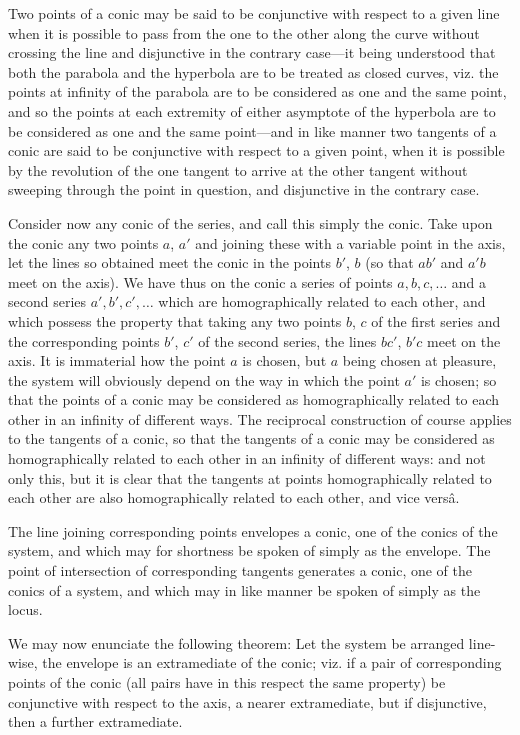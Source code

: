 \documentclass[11pt,a4paper]{book}
\begin{document}
Two points of a conic may be said to be conjunctive with respect to a given line when it is possible to pass from the one to the other along the curve without crossing the line and disjunctive in the contrary case---it being understood that both the parabola and the hyperbola are to be treated as closed curves, viz. the points at infinity of the parabola are to be considered as one and the same point, and so the points at each extremity of either asymptote of the hyperbola are to be considered as one and the same point---and in like manner two tangents of a conic are said to be conjunctive with respect to a given point, when it is possible by the revolution of the one tangent to arrive at the other tangent without sweeping through the point in question, and disjunctive in the contrary case.

Consider now any conic of the series, and call this simply the conic. Take upon the conic any two points $a$, $a'$ and joining these with a variable point in the axis, let the lines so obtained meet the conic in the points $b'$, $b$ (so that $ab'$ and $a'b$ meet on the axis). We have thus on the conic a series of points $a, b, c, \ldots$ and a second series $a', b', c', \ldots$ which are homographically related to each other, and which possess the property that taking any two points $b$, $c$ of the first series and the corresponding points $b'$, $c'$ of the second series, the lines $bc'$, $b'c$ meet on the axis. It is immaterial how the point $a$ is chosen, but $a$ being chosen at pleasure, the system will obviously depend on the way in which the point $a'$ is chosen; so that the points of a conic may be considered as homographically related to each other in an infinity of different ways. The reciprocal construction of course applies to the tangents of a conic, so that the tangents of a conic may be considered as homographically related to each other in an infinity of different ways: and not only this, but it is clear that the tangents at points homographically related to each other are also homographically related to each other, and vice vers\^{a}.

The line joining corresponding points envelopes a conic, one of the conics of the system, and which may for shortness be spoken of simply as the envelope. The point of intersection of corresponding tangents generates a conic, one of the conics of a system, and which may in like manner be spoken of simply as the locus.

We may now enunciate the following theorem: Let the system be arranged line-wise, the envelope is an extramediate of the conic; viz. if a pair of corresponding points of the conic (all pairs have in this respect the same property) be conjunctive with respect to the axis, a nearer extramediate, but if disjunctive, then a further extramediate.
\end{document}
